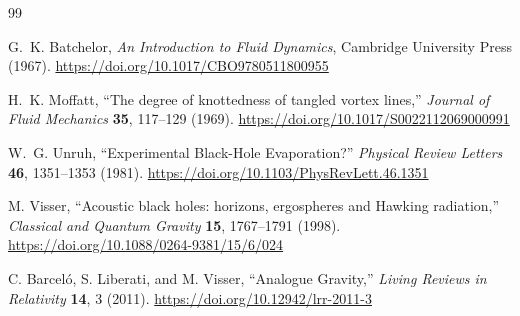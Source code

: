 \begin{thebibliography}{99}

G.~K. Batchelor,
\textit{An Introduction to Fluid Dynamics},
Cambridge University Press (1967).
\url{https://doi.org/10.1017/CBO9780511800955}

H.~K. Moffatt,
``The degree of knottedness of tangled vortex lines,''
\textit{Journal of Fluid Mechanics} \textbf{35}, 117--129 (1969).
\url{https://doi.org/10.1017/S0022112069000991}

W.~G. Unruh,
``Experimental Black-Hole Evaporation?''
\textit{Physical Review Letters} \textbf{46}, 1351--1353 (1981).
\url{https://doi.org/10.1103/PhysRevLett.46.1351}

M. Visser,
``Acoustic black holes: horizons, ergospheres and Hawking radiation,''
\textit{Classical and Quantum Gravity} \textbf{15}, 1767--1791 (1998).
\url{https://doi.org/10.1088/0264-9381/15/6/024}

C. Barcel\'o, S. Liberati, and M. Visser,
``Analogue Gravity,''
\textit{Living Reviews in Relativity} \textbf{14}, 3 (2011).
\url{https://doi.org/10.12942/lrr-2011-3}

\end{thebibliography}
